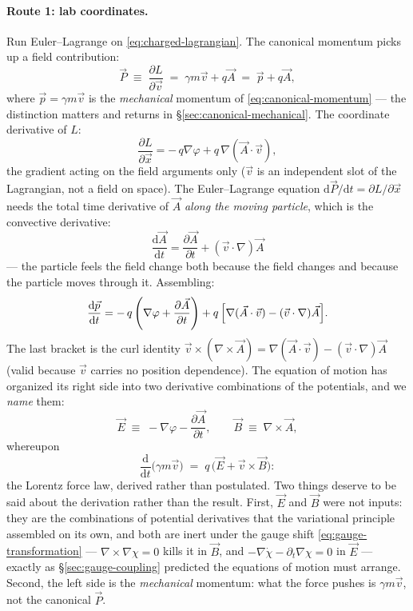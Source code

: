 \documentclass[11pt]{article}
\theoremstyle{plain}
\theoremstyle{definition}
\theoremstyle{remark}
\newcommand{\dd}{\mathrm{d}}
\newcommand{\pd}[2]{\frac{\partial #1}{\partial #2}}
\newcommand{\tot}[2]{\frac{\dd #1}{\dd #2}}
\newcommand{\vx}{\vec{x}}
\newcommand{\vv}{\vec{v}}
\newcommand{\vp}{\vec{p}}
\newcommand{\vE}{\vec{E}}
\newcommand{\vB}{\vec{B}}
\begin{document}
\paragraph{Route 1: lab coordinates.}
Run Euler--Lagrange on \eqref{eq:charged-lagrangian}. The canonical
momentum picks up a field contribution:
\begin{equation}
  \boxed{\;
  \vec P \;\equiv\; \pd{L}{\vv}
  \;=\; \gamma m \vv + q \vec A
  \;=\; \vp + q\vec A,
  \;}
  \label{eq:canonical-vs-mechanical}
\end{equation}
where $\vp = \gamma m \vv$ is the \emph{mechanical} momentum of
\eqref{eq:canonical-momentum} --- the distinction matters and returns
in \S\ref{sec:canonical-mechanical}. The coordinate derivative of $L$:
\begin{equation}
  \pd{L}{\vx}
  = -\,q\nabla\varphi + q\,\nabla(\vec A \cdot \vv),
\end{equation}
the gradient acting on the field arguments only ($\vv$ is an
independent slot of the Lagrangian, not a field on space). The
Euler--Lagrange equation
$\dd\vec P/\dd t = \partial L/\partial\vx$ needs the total time
derivative of $\vec A$ \emph{along the moving particle}, which is the
convective derivative:
\begin{equation}
  \tot{\vec A}{t}
  = \pd{\vec A}{t} + (\vv \cdot \nabla)\vec A
\end{equation}
--- the particle feels the field change both because the field changes
and because the particle moves through it. Assembling:
\begin{equation}
  \tot{\vp}{t}
  = -\,q\left(\nabla\varphi + \pd{\vec A}{t}\right)
    + q\,\Bigl[\nabla(\vec A \cdot \vv) - (\vv\cdot\nabla)\vec A\Bigr].
  \label{eq:force-raw}
\end{equation}
The last bracket is the curl identity
$\vv \times (\nabla \times \vec A) =
\nabla(\vec A\cdot\vv) - (\vv\cdot\nabla)\vec A$ (valid because $\vv$
carries no position dependence). The equation of motion has organized
its right side into two derivative combinations of the potentials, and
we \emph{name} them:
\begin{equation}
  \vE \;\equiv\; -\nabla\varphi - \pd{\vec A}{t},
  \qquad
  \vB \;\equiv\; \nabla \times \vec A ,
  \label{eq:E-B-definitions}
\end{equation}
whereupon
\begin{equation}
  \boxed{\;
  \tot{}{t}\bigl(\gamma m \vv\bigr)
  \;=\; q\,\bigl(\vE + \vv \times \vB\bigr) :
  \;}
  \label{eq:lorentz-force}
\end{equation}
the Lorentz force law, derived rather than postulated. Two things deserve to be said
about the derivation rather than the result. First, $\vE$ and $\vB$
were not inputs: they are the combinations of potential derivatives
that the variational principle assembled on its own, and both are
inert under the gauge shift \eqref{eq:gauge-transformation} ---
$\nabla \times \nabla\chi = 0$ kills it in $\vB$, and
$-\nabla\dot\chi - \partial_t\nabla\chi = 0$ in $\vE$ --- exactly as
\S\ref{sec:gauge-coupling} predicted the equations of motion must
arrange. Second, the left side is the \emph{mechanical} momentum: what
the force pushes is $\gamma m\vv$, not the canonical $\vec P$.
\end{document}
